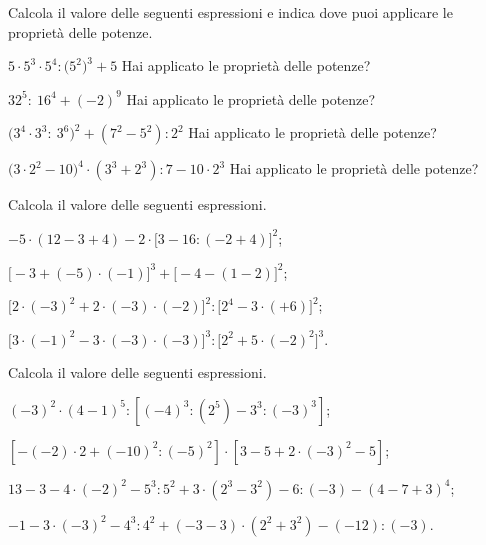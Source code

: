 \begin{esercizio}[\Ast]
Calcola il valore delle seguenti espressioni e indica dove puoi applicare le proprietà delle potenze.
\TabPositions{5.5cm}
\begin{enumeratea}
 \item $5\cdot 5^3\cdot 5^4: \big(5^2\big)^3 +5$ \tab Hai applicato le proprietà delle potenze?\:\dotfill
 \item $32^5:~16^4 +(-2)^9$ \tab Hai applicato le proprietà delle potenze?\:\dotfill
 \item $\big(3^4\cdot 3^3:~3^6\big)^2 +(7^2-5^2):2^2$ \tab Hai applicato le proprietà delle potenze?\:\dotfill
 \item $\big(3\cdot 2^2 -10\big)^4\cdot (3^3+2^3):7-10\cdot 2^3$ \tab Hai applicato le proprietà delle potenze?\:\dotfill
\end{enumeratea}
\end{esercizio}

\begin{esercizio}[\Ast]
Calcola il valore delle seguenti espressioni.
 \begin{enumeratea}
 \item $-5\cdot(12-3+4)-2\cdot\big[3-16:(-2+4)\big]^2$;
 \item $\big[-3+(-5)\cdot(-1)\big]^3+\big[-4-(1-2)\big]^2$;
 \item $\big[2\cdot(-3)^2+2\cdot(-3)\cdot(-2)\big]^2:\big[2^4-3\cdot(+6)\big]^2$;
 \item $\big[3\cdot(-1)^2-3\cdot(-3)\cdot(-3)\big]^3:\big[2^2+5\cdot(-2)^2\big]^3$.
 \end{enumeratea}
\end{esercizio}

\begin{esercizio}[\Ast]
Calcola il valore delle seguenti espressioni.
 \begin{enumeratea}
 \item $(-3)^2\cdot(4-1)^5:[(-4)^3:(2^5)-3^3:(-3)^3]$;
 \item $[-(-2)\cdot2+(-10)^2:(-5)^2]\cdot[3-5+2\cdot(-3)^2-5]$;
 \item $13-3-4\cdot(-2)^2-5^3:5^2+3\cdot(2^3-3^2)-6:(-3)-(4-7+3)^4$;
 \item $-1-3\cdot(-3)^2-4^3:4^2+(-3-3)\cdot(2^2+3^2)-(-12):(-3)$.
 \end{enumeratea}
\end{esercizio}

